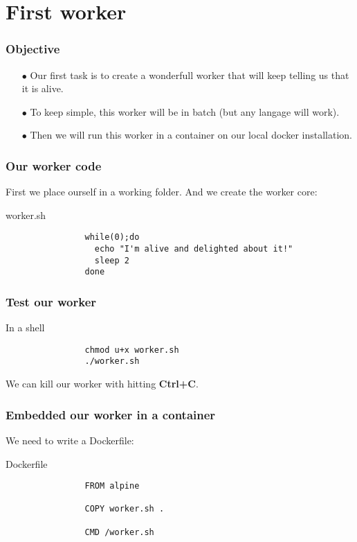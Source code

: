 \section{First worker}
	
	\begin{frame}
		\frametitle{Objective}
		
		\begin{itemize}
			\item[$\bullet$] Our first task is to create a wonderfull worker that will keep telling us that it is alive.
			\item[$\bullet$] To keep simple, this worker will be in batch (but any langage will work).	
			\item[$\bullet$] Then we will run this worker in a container on our local docker installation.
		\end{itemize}
		
	\end{frame}		
	
	\begin{frame}[fragile]
		\frametitle{Our worker code}

		First we place ourself in a working folder. And we create the worker core:
		
		\begin{block}{worker.sh}
			\begin{verbatim}
				while(0);do
				  echo "I'm alive and delighted about it!"
				  sleep 2
				done
			\end{verbatim}
		\end{block}
		
	\end{frame}

	\begin{frame}[fragile]
		\frametitle{Test our worker}
		
		\begin{block}{In a shell}
			\begin{verbatim}
				chmod u+x worker.sh
				./worker.sh
			\end{verbatim}
		\end{block}
		We can kill our worker with hitting \textbf{Ctrl+C}.
		
	\end{frame}
	
	\begin{frame}[fragile]
		\frametitle{Embedded our worker in a container}
		
		We need to write a Dockerfile:
		
		\begin{block}{Dockerfile}
			\begin{verbatim}
				FROM alpine

				COPY worker.sh .

				CMD /worker.sh
			\end{verbatim}
		\end{block}
	\end{frame}
	
